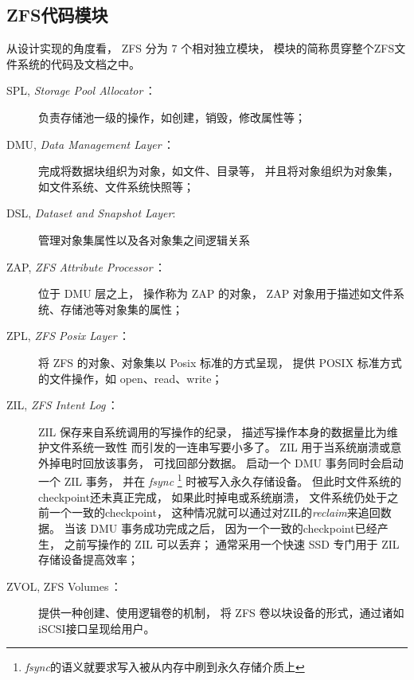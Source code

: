 \subsection{ZFS代码模块}
从设计实现的角度看，
ZFS 分为 7 个相对独立模块，
模块的简称贯穿整个ZFS文件系统的代码及文档之中。

\begin{description}
  \item[SPL, {\em Storage Pool Allocator}\,：]
    负责存储池一级的操作，如创建，销毁，修改属性等；
  \item[DMU, {\em Data Management Layer}\,：]
    完成将数据块组织为对象，如文件、目录等，
    并且将对象组织为对象集，如文件系统、文件系统快照等；
  \item[DSL, {\em Dataset and Snapshot Layer}:]
    管理对象集属性以及各对象集之间逻辑关系
  \item[ZAP, {\em ZFS Attribute Processor}\,：]
    位于 DMU 层之上，
    操作称为 ZAP 的对象，
    ZAP 对象用于描述如文件系统、存储池等对象集的属性；
  \item[ZPL, {\em ZFS Posix Layer}\,：]
    将 ZFS 的对象、对象集以 Posix 标准的方式呈现，
    提供 POSIX 标准方式的文件操作，如 open、read、write；
  \item[ZIL, {\em ZFS Intent Log}\,：]
    ZIL 保存来自系统调用的写操作的纪录，
    描述写操作本身的数据量比为维护文件系统一致性%
    而引发的一连串写要小多了。
    ZIL 用于当系统崩溃或意外掉电时回放该事务，
    可找回部分数据。
    启动一个 DMU 事务同时会启动一个 ZIL 事务，
    并在 {\em fsync}%
    \footnote{{\em fsync}的语义就要求写入被从内存中刷到永久存储介质上}
    时被写入永久存储设备。
    但此时文件系统的checkpoint还未真正完成，
    如果此时掉电或系统崩溃，
    文件系统仍处于之前一个一致的checkpoint，
    这种情况就可以通过对ZIL的{\em reclaim}来追回数据。
    当该 DMU 事务成功完成之后，
    因为一个一致的checkpoint已经产生，
    之前写操作的 ZIL 可以丢弃；
    通常采用一个快速 SSD 专门用于 ZIL 存储设备提高效率；
  \item[ZVOL, {ZFS Volumes}\,：]
    提供一种创建、使用逻辑卷的机制，
    将 ZFS 卷以块设备的形式，通过诸如iSCSI接口呈现给用户。
\end{description}
